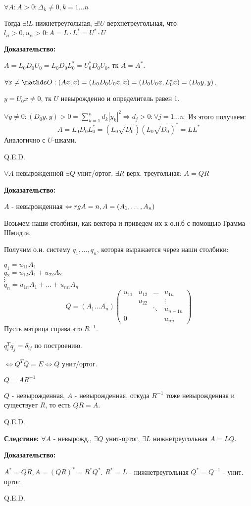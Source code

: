 
$\forall A : A>0: \Delta_k \neq 0, k = 1\ldots n$

Тогда $\exists! L$ нижнетреугольная, $\exists ! U$ верхнетреугольная, что $l_{ii}>0, u_{ii}>0:A = L \cdot L^* = U^*\cdot U$

\textbf{Доказательство:}

$A = L_0D_0 U_0 = L_0 D_0 L_0^* = U_0^* D_0 U_0$, тк $A = A^*$.

$\forall x \neq \zero : (Ax, x)  = (L_0D_0 U_0x,x) = (D_0 U_0 x, L_0^*x) =   (D_0y,y)$.

$y = U_0x \neq 0 $, тк $U$ невырожденно и определитель равен 1.

$\forall y \neq 0: (D_0y,y)>0 = \sum\limits_{k=1}^n d_k |y_k|^2 \Rightarrow d_j > 0: \forall j = 1\ldots n$. Из этого получаем:
$$A = L_0 D_0 L_0^* = (L_0 \sqrt{D_0})(L_0 \sqrt{D_0})^* = L L^*$$
Аналогично с $U$-шками.

\hfill Q.E.D.


$\forall A$ невырожденной $\exists Q$ унит/ортог. $\exists R$ верх. треугольная: $A = QR$

\textbf{Доказательство:}

$A$ - невырожденная $\Leftrightarrow rg A = n, A = (A_1,\ldots ,A_n)$

Возьмем наши столбики, как вектора и приведем их к о.н.б с помощью Грамма-Шмидта.

Получим о.н. систему $q_1,\ldots, q_n$, которая выражается через наши столбики:

$q_1 = u_{11}A_1$\\
$q_2 = u_{12}A_1 + u_{22}A_2$\\
$\vdots$\\
$q_n = u_{1n}A_1 + \ldots + u_{nn}A_n$
$$Q = (A_1 \ldots A_n) \begin{pmatrix}
    u_{11} & u_{12} & \ldots & u_{1n}\\
     & u_{22} & &\vdots\\
    & & \ddots & u_{n-1n}\\
   0 & & & u_{nn} 
\end{pmatrix}$$
Пусть матрица справа это $R^{-1}$.

$q_{i}^T \overline{q_j} = \delta_{ij}$ по построению.

$\Leftrightarrow Q^T \overline{Q} = E \Leftrightarrow Q$ унит/ортог. 

$Q = AR^{-1}$

$Q$ - невырожденная, $A$ - невырожденная, откуда $R^{-1}$ тоже невырожденная и существует $R$, то есть $QR = A$.

\hfill Q.E.D.

\textbf{Следствие:} $\forall A$ - невырожд., $\exists Q$ унит-ортог, $\exists L$ нижнетреугольная $A = LQ$.

\textbf{Доказательство:}

$A^* = QR, A = (QR)^*  = R^*Q^*$. $R^*=L$ - нижнетреугольная $Q^* = Q^{-1}$ - унит. ортог.

\hfill Q.E.D.
